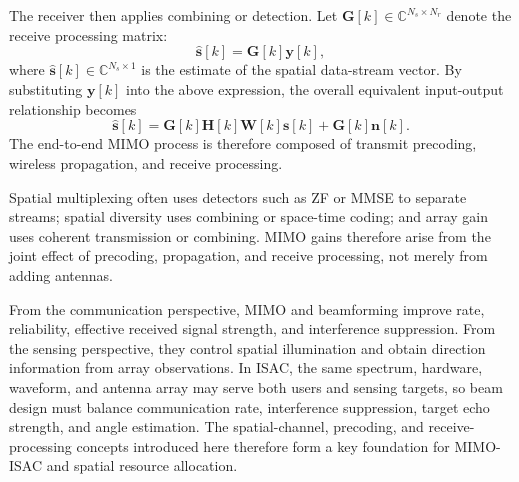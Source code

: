 The receiver then applies combining or detection.
Let \(\mathbf{G}[k]\in\mathbb{C}^{N_s\times N_r}\) denote the receive
processing matrix:
\[
\hat{\mathbf{s}}[k]
=
\mathbf{G}[k]\mathbf{y}[k],
\]
where
\(\hat{\mathbf{s}}[k]\in\mathbb{C}^{N_s\times 1}\)
is the estimate of the spatial data-stream vector.
By substituting \(\mathbf{y}[k]\) into the above expression,
the overall equivalent input-output relationship becomes
\begin{equation}
\hat{\mathbf{s}}[k]
=
\mathbf{G}[k]\mathbf{H}[k]\mathbf{W}[k]\mathbf{s}[k]
+
\mathbf{G}[k]\mathbf{n}[k].
\label{eq:mimo_end_to_end_model}
\end{equation}
The end-to-end MIMO process is therefore composed of transmit precoding,
wireless propagation, and receive processing.

Spatial multiplexing often uses detectors such as \acs{ZF} or MMSE to separate
streams; spatial diversity uses combining or space-time coding; and array gain
uses coherent transmission or combining.
MIMO gains therefore arise from the joint effect of precoding, propagation, and
receive processing, not merely from adding antennas.

From the communication perspective, MIMO and beamforming improve rate,
reliability, effective received signal strength, and interference suppression.
From the sensing perspective, they control spatial illumination and obtain
direction information from array observations.
In ISAC, the same spectrum, hardware, waveform, and antenna array may serve
both users and sensing targets, so beam design must balance communication rate,
interference suppression, target echo strength, and angle estimation.
The spatial-channel, precoding, and receive-processing concepts introduced here
therefore form a key foundation for MIMO-ISAC and spatial resource allocation.


